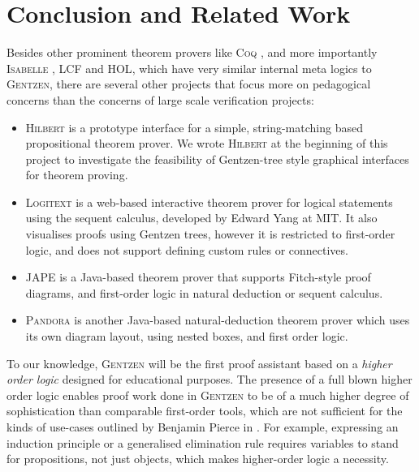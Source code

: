 \documentclass[a4paper]{jfp}
\begin{document}
\section{Conclusion and Related Work}

Besides other prominent theorem provers like \textsc{Coq} \cite{Team:vw}, and more importantly \textsc{Isabelle} \cite{Nipkow-Paulson-Wenzel:2002},
\textsc{LCF} \cite{Milner:1972:LCF:891954} and \textsc{HOL}, which have very similar internal meta logics to \textsc{Gentzen}, there are several other projects that focus more on pedagogical concerns than the
concerns of large scale verification projects:

\begin{itemize}
 \item \textsc{Hilbert} is a prototype interface for a simple, string-matching based propositional theorem prover. We
         wrote \textsc{Hilbert} at the beginning of this project to investigate the feasibility of 
         Gentzen-tree style graphical interfaces for theorem proving.
 \item \textsc{Logitext} is a web-based interactive theorem prover for logical statements using the
         sequent calculus, developed by Edward Yang at MIT\@. It also visualises proofs using Gentzen trees, however it is restricted
         to first-order logic, and does not support defining custom rules or connectives.
 \item \textsc{JAPE} is a Java-based theorem prover that supports Fitch-style proof diagrams, and first-order logic in natural deduction or sequent calculus.
 \item \textsc{Pandora} is another Java-based natural-deduction theorem prover which uses its own diagram layout, using nested boxes, and first order logic.
         \end{itemize}

To our knowledge, \textsc{Gentzen} will be the first proof assistant based on a \emph{higher order logic}
designed for educational purposes. The presence of a full blown higher order logic enables proof work 
done in \textsc{Gentzen} to be of a much higher degree of sophistication than comparable first-order tools, which are not sufficient for the kinds of use-cases outlined by Benjamin Pierce in \cite{Pierce:2009:LUT:1596550.1596552}. For example, expressing an induction principle or a generalised elimination rule requires variables to stand for propositions, not just objects, which makes higher-order logic a necessity.
\end{document}
